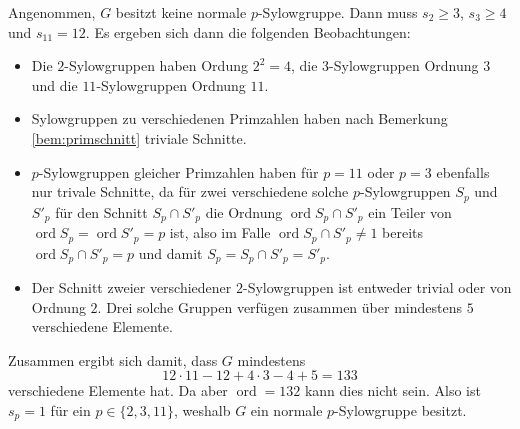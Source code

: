 \documentclass[a4paper,10pt]{article}
\theoremstyle{definition}
\newcommand{\ord}{\operatorname{ord}}
\begin{document}
Angenommen, $G$ besitzt keine normale $p$-Sylowgruppe. Dann muss $s_2 \geq 3$, $s_3 \geq 4$ und $s_{11} = 12$. Es ergeben sich dann die folgenden Beobachtungen:
\begin{itemize}
 \item Die $2$-Sylowgruppen haben Ordung $2^2=4$, die $3$-Sylowgruppen Ordnung $3$ und die $11$-Sylowgruppen Ordnung $11$.
 \item Sylowgruppen zu verschiedenen Primzahlen haben nach Bemerkung \ref{bem:primschnitt} triviale Schnitte.
 \item $p$-Sylowgruppen gleicher Primzahlen haben für $p = 11$ oder $p = 3$ ebenfalls nur trivale Schnitte, da für zwei verschiedene solche $p$-Sylowgruppen $S_p$ und $S'_p$ für den Schnitt $S_p \cap S'_p$ die Ordnung $\ord S_p \cap S'_p$ ein Teiler von $\ord S_p = \ord S'_p = p$ ist, also im Falle $\ord S_p \cap S'_p \neq 1$ bereits $\ord S_p \cap S'_p = p$ und damit $S_p = S_p \cap S'_p = S'_p$.
 \item Der Schnitt zweier verschiedener $2$-Sylowgruppen ist entweder trivial oder von Ordnung $2$. Drei solche Gruppen verfügen zusammen über mindestens $5$ verschiedene Elemente.
\end{itemize}
Zusammen ergibt sich damit, dass $G$ mindestens
\[
 12 \cdot 11 - 12 + 4 \cdot 3 - 4 + 5 = 133
\]
verschiedene Elemente hat. Da aber $\ord = 132$ kann dies nicht sein. Also ist $s_p = 1$ für ein $p \in \{2,3,11\}$, weshalb $G$ ein normale $p$-Sylowgruppe besitzt.


 
\end{document}
